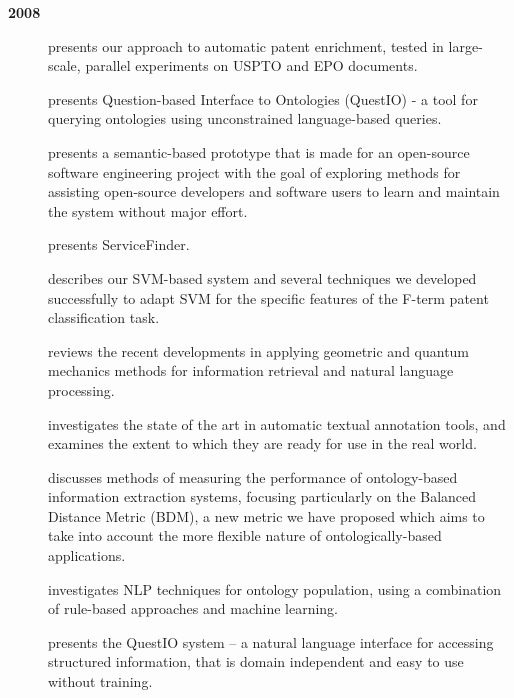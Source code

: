 \textbf{2008}
%
\begin{description}

\item[\cite{Agatonovic08}] presents our approach to automatic patent enrichment, tested in large-scale, parallel experiments on USPTO and EPO documents.

\item[\cite{DamljanovicTB08}] presents Question-based
Interface to Ontologies (QuestIO) - a tool for querying ontologies
using unconstrained language-based queries.

\item[\cite{DamljanovicB08a}] presents a semantic-based prototype that
is made for an open-source software engineering project with the goal
of exploring methods for assisting open-source developers and software
users to learn and maintain the system without major effort.


\item[\cite{DellaValle08}] presents ServiceFinder.

\item[\cite{Yaoyong08}] describes our SVM-based system and several techniques we developed successfully to adapt SVM for the specific features of the F-term patent classification task.

\item[\cite{Li08}] reviews the recent developments in applying geometric and quantum mechanics methods for information retrieval and natural language processing.

\item[\cite{Maynard08b}] investigates the state of the art in automatic textual annotation tools, and examines the extent to which they are ready for use
in the real world.

\item[\cite{Maynard08c}] discusses methods of measuring the performance of ontology-based information extraction systems, focusing particularly
on the Balanced Distance Metric (BDM), a new metric we have proposed
which aims to take into account the more flexible nature of
ontologically-based applications.
%
\item[\cite{Maynard07c}] investigates NLP techniques for ontology population, using a combination of rule-based approaches and machine learning.

\item[\cite{TablanDB08}] presents the QuestIO system – a natural language interface
for accessing structured information, that is domain independent and
easy to use without training.


\end{description}

